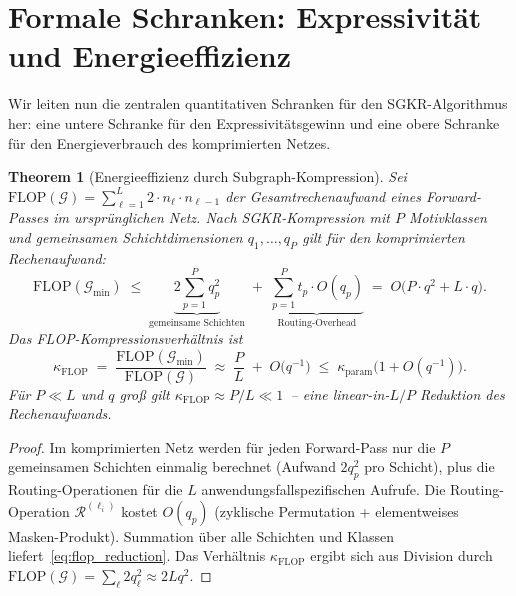 \documentclass[12pt, a4paper, openany]{report}
\newtheorem{theorem}{Theorem}[chapter]
\newcommand{\calG}{\mathcal{G}}
\newcommand{\calR}{\mathcal{R}}
\begin{document}
\section{Formale Schranken: Expressivität und Energieeffizienz}
\label{sec:sgkr_bounds}

Wir leiten nun die zentralen quantitativen Schranken für den
SGKR-Algorithmus her: eine untere Schranke für den Expressivitätsgewinn
und eine obere Schranke für den Energieverbrauch des komprimierten Netzes.

\begin{theorem}[Energieeffizienz durch Subgraph-Kompression]
\label{thm:energy_efficiency}
Sei $\mathrm{FLOP}(\calG) = \sum_{\ell=1}^L 2 \cdot n_\ell \cdot n_{\ell-1}$
der Gesamtrechenaufwand eines Forward-Passes im ursprünglichen Netz.  Nach
SGKR-Kompression mit $P$ Motivklassen und gemeinsamen Schichtdimensionen
$q_1, \ldots, q_P$ gilt für den komprimierten Rechenaufwand:
\begin{equation}
  \label{eq:flop_reduction}
  \mathrm{FLOP}(\calG_{\min})
  \;\leq\;
  \underbrace{
    2\sum_{p=1}^{P} q_p^2
  }_{\text{gemeinsame Schichten}}
  \;+\;
  \underbrace{
    \sum_{p=1}^{P} t_p \cdot O(q_p)
  }_{\text{Routing-Overhead}}
  \;=\;
  O\!\bigl(P \cdot q^2 + L \cdot q\bigr).
\end{equation}
Das \emph{FLOP-Kompressionsverhältnis} ist
\begin{equation}
  \label{eq:flop_ratio}
  \kappa_{\mathrm{FLOP}}
  \;=\;
  \frac{\mathrm{FLOP}(\calG_{\min})}{\mathrm{FLOP}(\calG)}
  \;\approx\;
  \frac{P}{L} \;+\; O\!\bigl(q^{-1}\bigr)
  \;\leq\; \kappa_{\mathrm{param}}\bigl(1 + O(q^{-1})\bigr).
\end{equation}
Für $P \ll L$ und $q$ groß gilt $\kappa_{\mathrm{FLOP}} \approx P/L \ll 1$~--
eine linear-in-$L/P$ Reduktion des Rechenaufwands.
\end{theorem}

\begin{proof}
Im komprimierten Netz werden für jeden Forward-Pass nur die $P$ gemeinsamen
Schichten einmalig berechnet (Aufwand $2q_p^2$ pro Schicht), plus die
Routing-Operationen für die $L$ anwendungsfallspezifischen Aufrufe.
Die Routing-Operation $\calR^{(\ell_i)}$ kostet $O(q_p)$ (zyklische
Permutation + elementweises Masken-Produkt).  Summation über alle
Schichten und Klassen liefert~\eqref{eq:flop_reduction}.  Das Verhältnis
$\kappa_{\mathrm{FLOP}}$ ergibt sich aus Division durch
$\mathrm{FLOP}(\calG) = \sum_\ell 2 q_\ell^2 \approx 2Lq^2$.
\end{proof}
\end{document}
